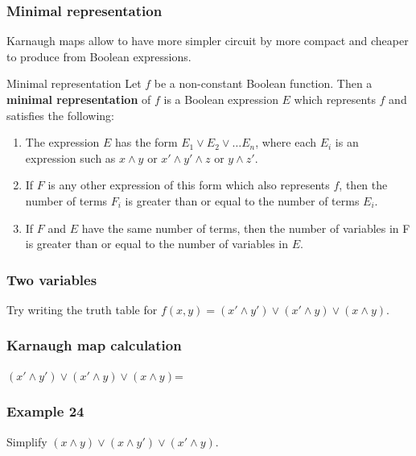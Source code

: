 \documentclass[
	11pt, %
]{beamer}
\begin{document}
\begin{frame}
    \frametitle{Minimal representation}
    Karnaugh maps allow to have more simpler circuit by more compact and cheaper to produce from Boolean expressions.\\
    \begin{block}{Minimal representation}
        Let $f$ be a non-constant Boolean function. Then a \textbf{minimal representation} of $f$ is a Boolean expression $E$ which represents $f$ and satisfies the following:\\
        \begin{enumerate}
            \item The expression $E$ has the form $E_1 \lor E_2 \lor \dots E_n$, where each $E_i$ is an expression such as $x \land y$ or $x' \land y' \land z$ or $y \land z'$.
            \item If $F$ is any other expression of this form which also represents $f$, then the number of terms $F_i$ is greater than or equal to the number of terms $E_i$.
            \item If $F$ and $E$ have the same number of terms, then the number of variables in F is greater than or equal to the number of variables in $E$.
        \end{enumerate}
    \end{block}
\end{frame}

\begin{frame}[t]
    \frametitle{Two variables}
    Try writing the truth table for $f(x,y) = (x' \land y') \lor (x' \land y) \lor (x \land y)$.
\end{frame}

\begin{frame}[t]
    \frametitle{Karnaugh map calculation}
    $(x' \land y') \lor (x' \land y) \lor (x \land y)$=
\end{frame}

\begin{frame}[t]
    \frametitle{Example 24}
    Simplify $(x \land y) \lor (x \land y') \lor (x' \land y)$.
\end{frame}
\end{document}
